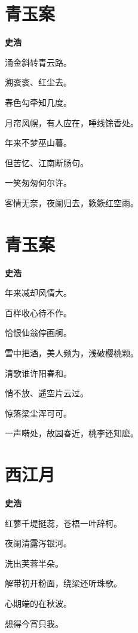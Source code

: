 \documentclass[12pt,a4paper]{ctexbook}
\begin{document}
\section{青玉案}
\textbf{史浩}\par\vspace{0.5em}
涌金斜转青云路。\par
溯衮衮、红尘去。\par
春色勾牵知几度。\par
月帘风幌，有人应在，唾线馀香处。\par
年来不梦巫山暮。\par
但苦忆、江南断肠句。\par
一笑匆匆何尔许。\par
客情无奈，夜阑归去，簌簌红空雨。\par

\section{青玉案}
\textbf{史浩}\par\vspace{0.5em}
年来减却风情大。\par
百样收心待不作。\par
恰恨仙翁停画舸。\par
雪中把酒，美人频为，浅破樱桃颗。\par
清歌谁许阳春和。\par
悄不放、遥空片云过。\par
惊落梁尘浑可可。\par
一声啭处，故园春近，桃李还知麽。\par

\section{西江月}
\textbf{史浩}\par\vspace{0.5em}
红蓼千堤挺蕊，苍梧一叶辞柯。\par
夜阑清露泻银河。\par
洗出芙蓉半朵。\par
解带初开粉面，绕梁还听珠歌。\par
心期端的在秋波。\par
想得今宵只我。\par
\end{document}
